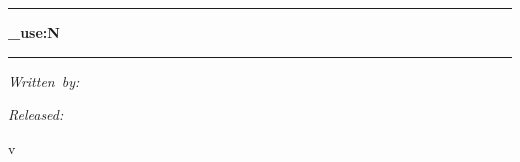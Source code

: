 \NewDocumentCommand{\forside}{}
{
	\thispagestyle{empty}
	
	\null\vspace{15mm}\noindent
	
	\begin{minipage}[t]{\textwidth}
		\centering
		\rule{\textwidth}{.4pt} \par \bigskip
		{ \Huge \bfseries \tl_use:N \titel \par } \bigskip
		\rule{\textwidth}{.4pt}
	\end{minipage} \par \vspace{6mm} \noindent
	
	\begin{minipage}[t]{0.5\textwidth}
		\centering
		\textsl{Written~by:} \par
		{ \color{RoyalRed} \forfatter \par }
		{ \color{RoyalRed} \email \par }
	\end{minipage}
	\hfill
	\begin{minipage}[t]{0.5\textwidth}
		\centering
		\textsl{Released:} \par
		{ \color{RoyalRed} v\version \par }
		{ \color{RoyalRed}  \dato \par }
	\end{minipage}
	
	\par \vspace{20mm} \noindent
	
	\begin{abstract}
		\noindent \ignorespaces
		The~\mypackage{}~package~provides~a~set~of~commands~which~makes~writing~ordinary~and~partial~derivatives~of~arbitrary~order~in~a~straight~forward~manner.~Additionally,~this~package~provides~a~set~of~commands~to~define~variants~of~the~aforementioned~derivatives.~A~set~of~optional~arguments~along~with~lots~of~package~options~allow~for~easy~and~great~flexibility~over~the~derivative's~format,~such~as~where~the~function~is~positioned,~point~of~evaluation,~and~switching~between~fraction~styles.~Moreover,~the~mixed~order~of~the~partial~derivative~and~variants~hereof~is~automatically~computed.~This~package~is~written~in~the~~language~and~requires~therefore~the~\LaTeX3~package~bundles~~and~.~Additionally,~the~~package~is~optional~and~provides~the~improved~automatically~scaling~~and~.
	\end{abstract}
	
	\vfill
	\clearpage
}

